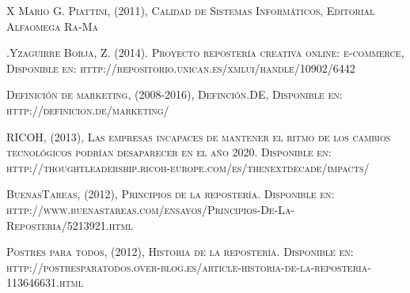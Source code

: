 \documentclass{bmcart}
\begin{document}
\begin{thebibliography}{X
\newline
\newline}
 \textsc{Mario G. Piattini, (2011), Calidad de Sistemas Informáticos, Editorial Alfaomega Ra-Ma}

 \textsc{.Yzaguirre Borja, Z. (2014). Proyecto repostería creativa online: e-commerce, Disponible en: http://repositorio.unican.es/xmlui/handle/10902/6442}

 \textsc{Definición de marketing, (2008-2016), Definción.DE, Disponible en: http://definicion.de/marketing/}

 \textsc{RICOH, (2013), Las empresas incapaces de mantener el ritmo de los cambios tecnológicos podrían desaparecer en el año 2020. Disponible en: http://thoughtleadership.ricoh-europe.com/es/thenextdecade/impacts/}

 \textsc{BuenasTareas, (2012), Principios de la repostería. Disponible en: http://www.buenastareas.com/ensayos/Principios-De-La-Reposteria/5213921.html}

 \textsc{Postres para todos, (2012), Historia de la repostería. Disponible en:  http://postresparatodos.over-blog.es/article-historia-de-la-reposteria-113646631.html}

\end{thebibliography}
\end{document}
